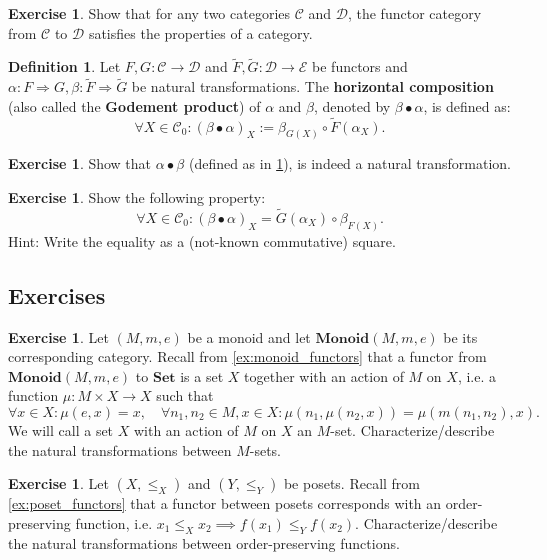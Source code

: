 \documentclass[a4paper,10pt]{scrartcl}
\theoremstyle{plain}
\theoremstyle{definition}
\newtheorem{dfn}[thm]{Definition}
\newtheorem{exer}[thm]{Exercise}
\newcommand{\Cat}[1]{\mathcal{#1}}
\newcommand{\CC}{\Cat{C}}
\newcommand{\DD}{\Cat{D}}
\newcommand{\EE}{\Cat{E}}
\newcommand{\Catb}[1]{\mathbf{#1}}
\newcommand{\SET}{\Catb{Set}}
\newcommand{\MON}{\Catb{Monoid}}
\newcommand{\Ob}[1]{{#1}_0}
\newcommand{\NatTrans}[3]{#1 : #2 \Rightarrow #3}
\newcommand{\co}[2]{\ensuremath{#2 \circ #1}}
\begin{document}
\begin{exer} Show that for any two categories $\CC$ and $\DD$, the functor category from $\CC$ to $\DD$ satisfies the properties of a category.
\end{exer}

\begin{dfn}\label{dfn:nattrans_horcomp} Let $F,G : \CC\to\DD$ and $\tilde{F},\tilde{G}:\DD\to\EE$ be functors and $\NatTrans{\alpha}{F}{G}, \NatTrans{\beta}{\tilde{F}}{\tilde{G}}$ be natural transformations. The \textbf{horizontal composition} (also called the \textbf{Godement product}) of $\alpha$ and $\beta$, denoted by $\beta \bullet \alpha$, is defined as:
\begin{equation}\label{eqn:nattrans_horcomp}
\forall X\in \Ob{\CC}: (\beta\bullet\alpha)_X := \co{\tilde{F}(\alpha_X)}{\beta_{G(X)}}.
\end{equation}
\end{dfn}

\begin{exer} Show that $\alpha\bullet\beta$ (defined as in \cref{dfn:nattrans_horcomp}), is indeed a natural transformation.
\end{exer}

\begin{exer} Show the following property: 
\[
\forall X\in \Ob{\CC}: (\beta\bullet\alpha)_X = \co{\beta_{F(X)}}{\tilde{G}(\alpha_X)}.
\]
Hint: Write the equality as a (not-known commutative) square.
\end{exer}

\subsection{Exercises}
\begin{exer} Let $(M,m,e)$ be a monoid and let $\MON(M,m,e)$ be its corresponding category. Recall from \cref{ex:monoid_functors} that a functor from $\MON(M,m,e)$ to $\SET$ is a set $X$ together with an action of $M$ on $X$, i.e. a function $\mu: M\times X\to X$ such that 
\[
\forall x\in X: \mu(e,x) = x, \quad \forall n_1,n_2\in M, x\in X: \mu(n_1, \mu(n_2,x)) = \mu(m(n_1,n_2), x).
\]
We will call a set $ X $ with an action of $ M $ on $ X $ an $ M $-set.
Characterize/describe the natural transformations between $M$-sets.
\end{exer}

\begin{exer} Let $(X,\leq_X)$ and $(Y,\leq_Y)$ be posets. Recall from \cref{ex:poset_functors} that a functor between posets corresponds with an order-preserving function, i.e. $x_1 \leq_X x_2 \implies f(x_1) \leq_Y f(x_2)$. Characterize/describe the natural transformations between order-preserving functions.
\end{exer}
\end{document}
